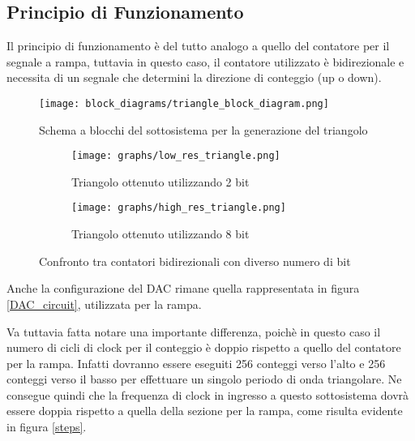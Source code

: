 
\subsection*{Principio di Funzionamento}


Il principio di funzionamento è del tutto analogo a quello del contatore per il segnale a
rampa, tuttavia in questo caso, il contatore utilizzato è bidirezionale e necessita di un
segnale che determini la direzione di conteggio (up o down).
\medskip

\begin{figure}[ht]
    \centering
    \texttt{[image: block\_diagrams/triangle\_block\_diagram.png]}
    \caption{Schema a blocchi del sottosistema per la generazione del triangolo}
    \label{triangle_block_diagram}
\end{figure}

\begin{figure}[ht]
    \centering

    \begin{subfigure}{.5\textwidth}
        \centering
        \texttt{[image: graphs/low\_res\_triangle.png]}
        \caption{Triangolo ottenuto utilizzando 2 bit}
        \label{low_res_triangle}
    \end{subfigure}%
    \begin{subfigure}{.5\textwidth}
        \centering
        \texttt{[image: graphs/high\_res\_triangle.png]}
        \caption{Triangolo ottenuto utilizzando 8 bit}
        \label{high_res_triangle}
    \end{subfigure}

    \caption{Confronto tra contatori bidirezionali con diverso numero di bit}
    \label{triangles}
\end{figure}

Anche la configurazione del DAC rimane quella rappresentata in figura \ref{DAC_circuit},
utilizzata per la rampa.

Va tuttavia fatta notare una importante differenza, poichè in questo caso il numero di cicli
di clock per il conteggio è doppio rispetto a quello del contatore per la rampa. Infatti
dovranno essere eseguiti 256 conteggi verso l'alto e 256 conteggi verso il basso per effettuare
un singolo periodo di onda triangolare. Ne consegue quindi che la frequenza di clock in ingresso
a questo sottosistema dovrà essere doppia rispetto a quella della sezione per la rampa, come
risulta evidente in figura \ref{steps}.
\medskip


